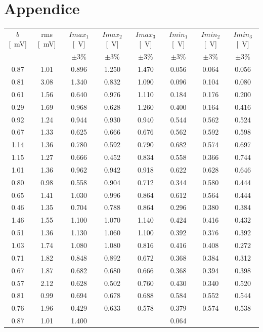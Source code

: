 \documentclass[10pt,oneside,a4paper]{article}
\begin{document}
\section{Appendice}
\begin{center}
\label{tab:intensita}
\begin{tabular}{c|c|c|c|c|c|c|c}
$b$ [\SI{}{mV}] & rms [\SI{}{mV}] & $Imax_1$ [\SI{}{V}] & $Imax_2$ [\SI{}{V}] & $Imax_3$ [\SI{}{V}] &  $Imin_1$ [\SI{}{V}] & $Imin_2$ [\SI{}{V}] & $Imin_3$ [\SI{}{V}]  \\
  &   &  $\pm 3\%$ & $\pm 3\%$ & $\pm 3\%$ &  $\pm 3\%$ & $\pm 3\%$ & $\pm 3\%$ \\
\hline
 0.87 & 1.01 &  0.896 & 1.250 & 1.470 &  0.056 & 0.064 & 0.056 \\
 0.81 & 3.08 &  1.340 & 0.832 & 1.090 &  0.096 & 0.104 & 0.080 \\
 0.61 & 1.56 &  0.640 & 0.976 & 1.110 &  0.184 & 0.176 & 0.200 \\
 0.29 & 1.69 &  0.968 & 0.628 & 1.260 &  0.400 & 0.164 & 0.416 \\
 0.92 & 1.24 &  0.944 & 0.930 & 0.940 &  0.544 & 0.562 & 0.524 \\
 0.67 & 1.33 &  0.625 & 0.666 & 0.676 &  0.562 & 0.592 & 0.598 \\
 1.14 & 1.36 &  0.780 & 0.592 & 0.790 &  0.682 & 0.574 & 0.697 \\
 1.15 & 1.27 &  0.666 & 0.452 & 0.834 &  0.558 & 0.366 & 0.744 \\
 1.01 & 1.36 &  0.962 & 0.942 & 0.918 &  0.622 & 0.628 & 0.646 \\
 0.80 & 0.98 &  0.558 & 0.904 & 0.712 &  0.344 & 0.580 & 0.444 \\
 0.65 & 1.41 &  1.030 & 0.996 & 0.864 &  0.612 & 0.564 & 0.444 \\
 0.46 & 1.35 &  0.704 & 0.788 & 0.864 &  0.296 & 0.380 & 0.384 \\
 1.46 & 1.55 &  1.100 & 1.070 & 1.140 &  0.424 & 0.416 & 0.432 \\
 0.51 & 1.36 &  1.130 & 1.060 & 1.100 &  0.392 & 0.376 & 0.392 \\
 1.03 & 1.74 &  1.080 & 1.080 & 0.816 &  0.416 & 0.408 & 0.272 \\
 0.71 & 1.82 &  0.848 & 0.892 & 0.672 &  0.368 & 0.384 & 0.312 \\
 0.67 & 1.87 &  0.682 & 0.680 & 0.666 &  0.368 & 0.394 & 0.398 \\
 0.57 & 2.12 &  0.628 & 0.502 & 0.760 &  0.430 & 0.340 & 0.520 \\
 0.81 & 0.99 &  0.694 & 0.678 & 0.688 &  0.584 & 0.552 & 0.544 \\
 0.76 & 1.96 &  0.429 & 0.633 & 0.578 &  0.379 & 0.574 & 0.538 \\
 0.87 & 1.01 &  1.400 &	   &	        &  0.064 & 	 & 	\\
\hline
\end{tabular}
\end{center}
\end{document}

